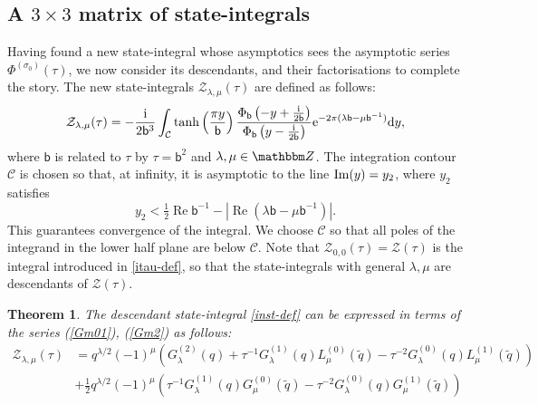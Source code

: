 \documentclass[12pt,reqno]{amsart}
\newtheorem{theorem}{Theorem}
\theoremstyle{definition}
\def\BZ{\mathbbm Z}
\def\calC{\mathcal C}
\def\s{\sigma}
\def\tq{\tilde{q}}
\def\be{\begin{equation}}
\def\ee{\end{equation}}
\def\bb{\mathsf{b}}
\def\ri{\mathrm{i}}
\def\rd{\mathrm{d}}
\def\re{{\rm e}}
\def\ri{{\rm i}}
\def\rd{{\rm d}}
\def\mc{\mathcal}
\newcommand{\fad}{\operatorname{\Phi}_{\mathsf{b}}}
\newcommand{\mb}{{\mathsf{b}}}
\DeclareMathOperator{\real}{Re}
\begin{document}
\subsection{A $3 \times 3$ matrix of state-integrals}
\label{sub.3x3state}

Having found a new state-integral whose asymptotics sees the asymptotic series
$\Phi^{(\s_0)}(\tau)$, we now consider its descendants, and their factorisations
to complete the story. 
The new state-integrals $\mc{Z}_{\lambda,\mu}(\tau)$ are defined
as follows: 
%
\be
\label{inst-def}
{\mc{Z}}_{\lambda, \mu}(\tau) = -\frac{\ri}{2\bb^3}\int_{\mathcal C}
\tanh\left( {\pi y \over \mb} \right)
{\fad \left( -y +{\ri \over 2 \mb} \right) \over \fad
  \left(y -{\ri \over 2 \mb} \right)} \re^{-2 \pi (\lambda \mb- \mu \mb^{-1})} \rd y,  
\ee
%
where $\mb$ is related to $\tau$ by $\tau= \mb^2$ and $\lambda,\mu\in \BZ$. The
integration contour $ {\mathcal C}$ is chosen so that, at infinity, it is asymptotic
to the line ${\rm Im}(y)=y_2$, where $y_2$ satisfies 
%
\begin{equation}
  y_2 < \tfrac{1}{2}\real \bb^{-1} - |\real(\lambda\bb-\mu\bb^{-1})|.
\end{equation}
%
This guarantees convergence of the integral. We choose $\calC$ so that
all poles of the integrand in the lower half plane are below $\calC$. Note that
$\mc{Z}_{0,0}(\tau)=\mc{Z}(\tau)$ is the integral introduced in
\eqref{itau-def}, so that the state-integrals with general $\lambda,\mu$ are
descendants of $\mc{Z}(\tau)$.  
%

\begin{theorem}
  \label{thm-newst}
  The descendant state-integral \eqref{inst-def} can be expressed in terms of
  the series (\ref{Gm01}), (\ref{Gm2}) as follows: 
  \begin{equation}
    \label{Zlmfac}
  \begin{aligned}
    {\mc{Z}}_{\lambda, \mu}(\tau) &= q^{\lambda/2} (-1)^{\mu}
    \left(  G_\lambda^{(2)}(q)+\tau^{-1}
      G_\lambda^{(1)}(q) L_\mu^{(0)}(\tq)
      -\tau^{-2}  G_\lambda^{(0)}(q) L_\mu^{(1)}(\tq) \right) \\
    & +\frac{1}{2}   q^{\lambda/2} (-1)^{\mu} \left( \tau^{-1}
      G_\lambda^{(1)}(q) G_\mu^{(0)}(\tq)
      - \tau^{-2}  G_\lambda^{(0)}(q) G_\mu^{(1)}(\tq) \right) 
\end{aligned}
\end{equation}
%
\end{theorem}
\end{document}
